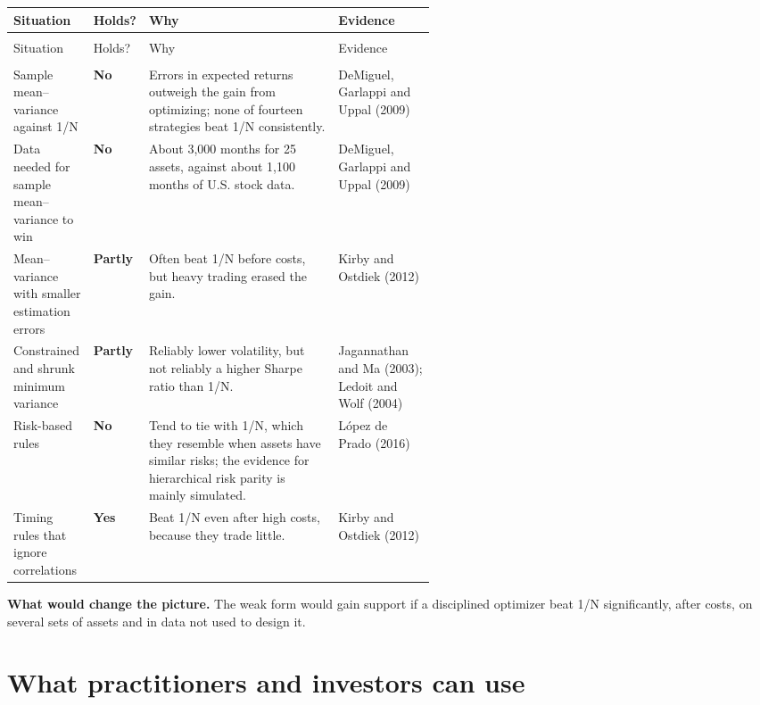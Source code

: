 {\small
\begin{longtable}{@{}>{\raggedright\arraybackslash}p{0.19\linewidth}>{\raggedright\arraybackslash}p{0.13\linewidth}>{\raggedright\arraybackslash}p{}>{\raggedright\arraybackslash}p{0.23\linewidth}@{}}
\toprule
Situation & Holds? & Why & Evidence \\
\midrule
\endfirsthead
\multicolumn{4}{@{}l}{\emph{(continued)}} \\
\toprule
Situation & Holds? & Why & Evidence \\
\midrule
\endhead
\midrule
\multicolumn{4}{r@{}}{\emph{(continued on the next page)}} \\
\endfoot
\bottomrule
\endlastfoot
Sample mean--variance against 1/N & \textbf{No} & Errors in expected returns outweigh the gain from optimizing; none of fourteen strategies beat 1/N consistently. & DeMiguel, Garlappi and Uppal (2009) \\*
\addlinespace[3pt]
Data needed for sample mean--variance to win & \textbf{No} & About 3,000 months for 25 assets, against about 1,100 months of U.S. stock data. & DeMiguel, Garlappi and Uppal (2009) \\
\addlinespace[3pt]
Mean--variance with smaller estimation errors & \textbf{Partly} & Often beat 1/N before costs, but heavy trading erased the gain. & Kirby and Ostdiek (2012) \\
\addlinespace[3pt]
Constrained and shrunk minimum variance & \textbf{Partly} & Reliably lower volatility, but not reliably a higher Sharpe ratio than 1/N. & Jagannathan and Ma (2003); Ledoit and Wolf (2004) \\
\addlinespace[3pt]
Risk-based rules & \textbf{No} & Tend to tie with 1/N, which they resemble when assets have similar risks; the evidence for hierarchical risk parity is mainly simulated. & L\'opez de Prado (2016) \\*
\addlinespace[3pt]
Timing rules that ignore correlations & \textbf{Yes} & Beat 1/N even after high costs, because they trade little. & Kirby and Ostdiek (2012) \\
\end{longtable}
\addtocounter{table}{-1}%
}

\textbf{What would change the picture.} The weak form would gain support if a disciplined optimizer beat 1/N significantly, after costs, on several sets of assets and in data not used to design it.

\section{What practitioners and investors can use}
\label{sec:12-investors}

